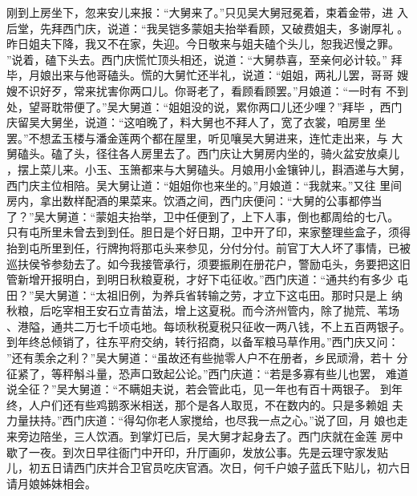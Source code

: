刚到上房坐下，忽来安儿来报：“大舅来了。”只见吴大舅冠冕着，束着金带，进
入后堂，先拜西门庆，说道：“我吴铠多蒙姐夫抬举看顾，又破费姐夫，多谢厚礼
。昨日姐夫下降，我又不在家，失迎。今日敬来与姐夫磕个头儿，恕我迟慢之罪。
”说着，磕下头去。西门庆慌忙顶头相还，说道：“大舅恭喜，至亲何必计较。”
拜毕，月娘出来与他哥磕头。慌的大舅忙还半礼，说道：“姐姐，两礼儿罢，哥哥
嫂嫂不识好歹，常来扰害你两口儿。你哥老了，看顾看顾罢。”月娘道：“一时有
不到处，望哥耽带便了。”吴大舅道：“姐姐没的说，累你两口儿还少哩？”拜毕
，西门庆留吴大舅坐，说道：“这咱晚了，料大舅也不拜人了，宽了衣裳，咱房里
坐罢。”不想孟玉楼与潘金莲两个都在屋里，听见嚷吴大舅进来，连忙走出来，与
大舅磕头。磕了头，径往各人房里去了。西门庆让大舅房内坐的，骑火盆安放桌儿
，摆上菜儿来。小玉、玉箫都来与大舅磕头。月娘用小金镶钟儿，斟酒递与大舅，
西门庆主位相陪。吴大舅让道：“姐姐你也来坐的。”月娘道：“我就来。”又往
里间房内，拿出数样配酒的果菜来。饮酒之间，西门庆便问：“大舅的公事都停当
了？”吴大舅道：“蒙姐夫抬举，卫中任便到了，上下人事，倒也都周给的七八。
只有屯所里未曾去到到任。胆日是个好日期，卫中开了印，来家整理些盒子，须得
抬到屯所里到任，行牌拘将那屯头来参见，分付分付。前官丁大人坏了事情，已被
巡扶侯爷参劾去了。如今我接管承行，须要振刷在册花户，警励屯头，务要把这旧
管新增开报明白，到明日秋粮夏税，才好下屯征收。”西门庆道：“通共约有多少
屯田？”吴大舅道：“太祖旧例，为养兵省转输之劳，才立下这屯田。那时只是上
纳秋粮，后吃宰相王安石立青苗法，增上这夏税。而今济州管内，除了抛荒、苇场
、港隘，通共二万七千顷屯地。每顷秋税夏税只征收一两八钱，不上五百两银子。
到年终总倾销了，往东平府交纳，转行招商，以备军粮马草作用。”西门庆又问：
”还有羡余之利？”吴大舅道：“虽故还有些抛零人户不在册者，乡民顽滑，若十
分征紧了，等秤斛斗量，恐声口致起公论。”西门庆道：“若是多寡有些儿也罢，
难道说全征？”吴大舅道：“不瞒姐夫说，若会管此屯，见一年也有百十两银子。
到年终，人户们还有些鸡鹅豕米相送，那个是各人取觅，不在数内的。只是多赖姐
夫力量扶持。”西门庆道：“得勾你老人家搅给，也尽我一点之心。”说了回，月
娘也走来旁边陪坐，三人饮酒。到掌灯已后，吴大舅才起身去了。西门庆就在金莲
房中歇了一夜。到次日早往衙门中开印，升厅画卯，发放公事。先是云理守家发贴
儿，初五日请西门庆并合卫官员吃庆官酒。次日，何千户娘子蓝氏下贴儿，初六日
请月娘姊妹相会。

